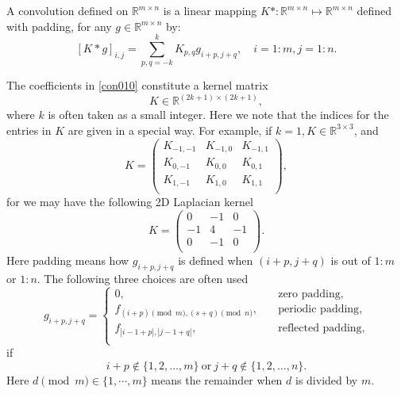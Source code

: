 \begin{definition}\label{def:convolution}
A convolution defined on $\mathbb{R}^{m\times n}$ is a linear mapping 
$K\ast: \mathbb{R}^{m\times n}\mapsto \mathbb{R}^{m\times n}$ defined with padding,  
for any $g \in \mathbb{R}^{m\times n}$ by:
\begin{equation}\label{con010}
[K \ast g]_{i,j} = \sum_{p,q=-k}^k K_{p, q} g_{i + p, j + q}, \quad i=1:m, j = 1:n.
\end{equation}
\end{definition}
The coefficients in \eqref{con010} constitute  a kernel matrix
\begin{equation}
K \in \mathbb{R}^{(2k+1) \times (2k+1)},
\end{equation}
where $k$ is often taken as a small integer. 
Here we note that the indices for the entries in $K$ are given in a special way. 
For example, if $k=1, K\in \mathbb R^{3\times 3}$, and 
$$
K=\begin{pmatrix}
	K_{-1,-1} &K_{-1,0} &K_{-1,1} \\
	K_{0,-1} &K_{0,0} &K_{0,1} \\
	K_{1,-1} &K_{1,0} &K_{1,1} \\
	\end{pmatrix},
$$
for we may have the following 2D Laplacian kernel
\begin{equation}\label{key}
K=\begin{pmatrix}
0 &-1 &0\\
-1 &4&-1 \\
0 &-1 &0 \\
\end{pmatrix}.
\end{equation}  
Here padding means how $ g_{i+ p, j + q}$ is defined
when $(i+ p, j + q)$ is out of $1:m$ or $1:n$. 
The following three choices are often used
\begin{equation}\label{eq:padding}
g_{i + p, j + q} = \begin{cases}
0,  \quad &\text{zero padding}, \\
f_{(i + p)\pmod{m}, (s + q)\pmod{n}},  \quad &\text{periodic padding}, \\
f_{|i-1 +p|, |j -1  +q|},  \quad &\text{reflected padding}, \\
\end{cases}
\end{equation}
if 
\begin{equation}
i + p \notin \{1, 2, \dots, m\} ~\text{or} ~  j+ q \notin \{1, 2, \dots, n\}.
\end{equation}
Here $ d \pmod{m} \in \{1, \cdots, m\} $  means the remainder when $d$ is divided by $m$.

